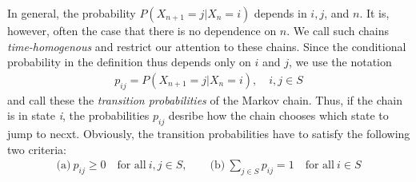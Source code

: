 In general, the probability $P(X_{n + 1} = j | X_n = i)$ depends in $i,j$, and $n$. It is, however, often the case that there is no dependence on $n$. We call such chains \textit{time-homogenous} and restrict our attention to these chains. Since the conditional probability in the definition thus depends only on $i$ and $j$, we use the notation
\begin{align*}
  p_{ij} = P(X_{n + 1} = j | X_n = i), \quad i,j \in S
\end{align*}
and call these the \textit{transition probabilities} of the Markov chain. Thus, if the chain is in state \textit{i}, the probabilities $p_{ij}$ desribe how the chain chooses which state to jump to necxt. Obviously, the transition probabilities have to satisfy the following two criteria:
\begin{align*}
  \text{(a)} \ p_{ij} \geq 0 \quad \text{for all} \ i,j \in S, \qquad
  \text{(b)} \ \sum_{j \in S} p_{ij} = 1 \quad \text{for all} \ i \in S
\end{align*}

